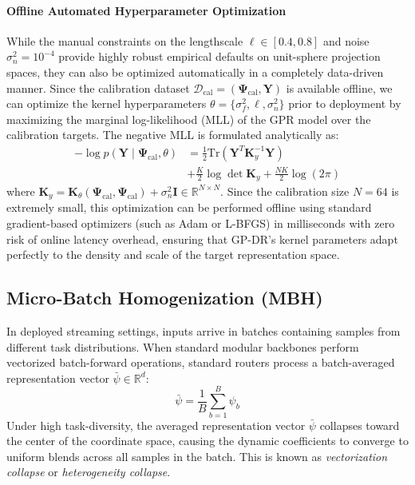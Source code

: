 \paragraph{Offline Automated Hyperparameter Optimization}
While the manual constraints on the lengthscale $\ell \in [0.4, 0.8]$ and noise $\sigma_n^2 = 10^{-4}$ provide highly robust empirical defaults on unit-sphere projection spaces, they can also be optimized automatically in a completely data-driven manner. Since the calibration dataset $\mathcal{D}_{\text{cal}} = (\mathbf{\Psi}_{\text{cal}}, \mathbf{Y})$ is available offline, we can optimize the kernel hyperparameters $\theta = \{\sigma_f^2, \ell, \sigma_n^2\}$ prior to deployment by maximizing the marginal log-likelihood (MLL) of the GPR model over the calibration targets. The negative MLL is formulated analytically as:
\begin{equation}
\begin{aligned}
-\log p(\mathbf{Y} \mid \mathbf{\Psi}_{\text{cal}}, \theta) &= \frac{1}{2} \text{Tr}(\mathbf{Y}^T \mathbf{K}_y^{-1} \mathbf{Y}) \\
&+ \frac{K}{2} \log \det \mathbf{K}_y + \frac{NK}{2} \log(2\pi)
\end{aligned}
\end{equation}
where $\mathbf{K}_y = \mathbf{K}_{\theta}(\mathbf{\Psi}_{\text{cal}}, \mathbf{\Psi}_{\text{cal}}) + \sigma_n^2 \mathbf{I} \in \mathbb{R}^{N \times N}$. Since the calibration size $N=64$ is extremely small, this optimization can be performed offline using standard gradient-based optimizers (such as Adam or L-BFGS) in milliseconds with zero risk of online latency overhead, ensuring that GP-DR's kernel parameters adapt perfectly to the density and scale of the target representation space.

\subsection{Micro-Batch Homogenization (MBH)}
In deployed streaming settings, inputs arrive in batches containing samples from different task distributions. When standard modular backbones perform vectorized batch-forward operations, standard routers process a batch-averaged representation vector $\bar{\psi} \in \mathbb{R}^d$:
\begin{equation}
\bar{\psi} = \frac{1}{B} \sum_{b=1}^B \psi_b
\end{equation}
Under high task-diversity, the averaged representation vector $\bar{\psi}$ collapses toward the center of the coordinate space, causing the dynamic coefficients to converge to uniform blends across all samples in the batch. This is known as \emph{vectorization collapse} or \emph{heterogeneity collapse}.

